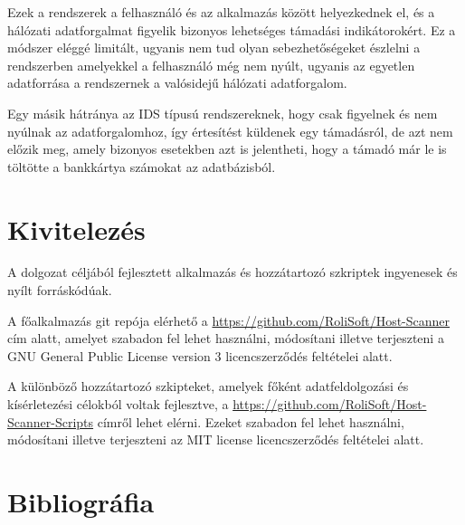 \documentclass[a4paper,12pt]{article}
\begin{document}
	Ezek a rendszerek a felhasználó és az alkalmazás között helyezkednek el, és a hálózati adatforgalmat figyelik bizonyos lehetséges támadási indikátorokért. Ez a módszer eléggé limitált, ugyanis nem tud olyan sebezhetőségeket észlelni a rendszerben amelyekkel a felhasználó még nem nyúlt, ugyanis az egyetlen adatforrása a rendszernek a valósidejű hálózati adatforgalom.
	
	Egy másik hátránya az IDS típusú rendszereknek, hogy csak figyelnek és nem nyúlnak az adatforgalomhoz, így értesítést küldenek egy támadásról, de azt nem előzik meg, amely bizonyos esetekben azt is jelentheti, hogy a támadó már le is töltötte a bankkártya számokat az adatbázisból.

\section{Kivitelezés}

	A dolgozat céljából fejlesztett alkalmazás és hozzátartozó szkriptek ingyenesek és nyílt forráskódúak.

	A főalkalmazás git repója elérhető a \url{https://github.com/RoliSoft/Host-Scanner} cím alatt, amelyet szabadon fel lehet használni, módosítani illetve terjeszteni a GNU General Public License version 3\cite{gplv3} licencszerződés feltételei alatt.
	
	A különböző hozzátartozó szkipteket, amelyek főként adatfeldolgozási és kísérletezési célokból voltak fejlesztve, a \url{https://github.com/RoliSoft/Host-Scanner-Scripts} címről lehet elérni. Ezeket szabadon fel lehet használni, módosítani illetve terjeszteni az MIT license\cite{mit} licencszerződés feltételei alatt.

\newpage
\section{Bibliográfia}

	\begingroup
	\renewcommand{\section}[2]{}
	\renewcommand{\markboth}[2]{}
		
		
	\endgroup
\end{document}
